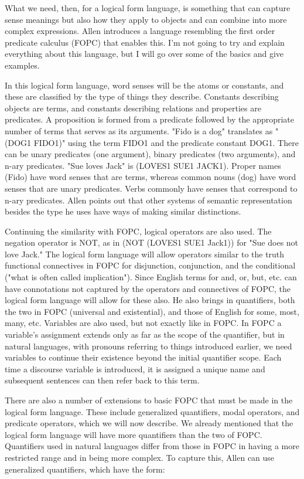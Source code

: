 What we need, then, for a logical form language, is something that can capture sense meanings but also how they apply to objects and can combine into more complex expressions. Allen introduces a language resembling the first order predicate calculus (FOPC) that enables this. I'm not going to try and explain everything about this language, but I will go over some of the basics and give examples.

In this logical form language, word senses will be the atoms or constants, and these are classified by the type of things they describe. Constants describing objects are terms, and constants describing relations and properties are predicates. A proposition is formed from a predicate followed by the appropriate number of terms that serves as its arguments. "Fido is a dog" translates as "(DOG1 FIDO1)" using the term FIDO1 and the predicate constant DOG1. There can be unary predicates (one argument), binary predicates (two arguments), and n-ary predicates. "Sue loves Jack" is (LOVES1 SUE1 JACK1). Proper names (Fido) have word senses that are terms, whereas common nouns (dog) have word senses that are unary predicates. Verbs commonly have senses that correspond to n-ary predicates. Allen points out that other systems of semantic representation besides the type he uses have ways of making similar distinctions.

Continuing the similarity with FOPC, logical operators are also used. The negation operator is NOT, as in (NOT (LOVES1 SUE1 Jack1)) for "Sue does not love Jack." The logical form language will allow operators similar to the truth functional connectives in FOPC for disjunction, conjunction, and the conditional ("what is often called implication"). Since English terms for and, or, but, etc. can have connotations not captured by the operators and connectives of FOPC, the logical form language will allow for these also. He also brings in quantifiers, both the two in FOPC (universal and existential), and those of English for some, most, many, etc. Variables are also used, but not exactly like in FOPC. In FOPC a variable's assignment extends only as far as the scope of the quantifier, but in natural languages, with pronouns referring to things introduced earlier, we need variables to continue their existence beyond the initial quantifier scope. Each time a discourse variable is introduced, it is assigned a unique name and subsequent sentences can then refer back to this term.

There are also a number of extensions to basic FOPC that must be made in the logical form language. These include generalized quantifiers, modal operators, and predicate operators, which we will now describe. We already mentioned that the logical form language will have more quantifiers than the two of FOPC. Quantifiers used in natural languages differ from those in FOPC in having a more restricted range and in being more complex. To capture this, Allen can use generalized quantifiers, which have the form:

